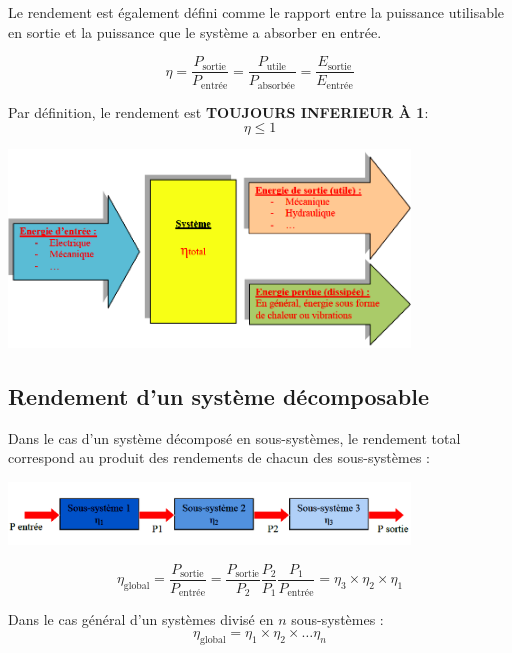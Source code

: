 \documentclass[10pt,fleqn]{article} %
\begin{document}
\begin{defi}
    Le rendement est également défini comme le rapport entre la puissance utilisable en sortie et la puissance que le système a absorber en entrée. 
    
    $$\eta = \frac{P_{\text{sortie}}}{P_{\text{entrée}}} = \frac{P_{\text{utile}}}{P_{\text{absorbée}}} = \frac{E_{\text{sortie}}}{E_{\text{entrée}}}$$
    
\parcoeur Par définition, le rendement est \textbf{TOUJOURS INFERIEUR À 1}: 
$$\eta \leq 1$$
\end{defi}

\begin{center}
    \includegraphics[width=0.8\textwidth]{Cours/images/rendement.png}
\end{center}

\subsection{Rendement d'un système décomposable}
Dans le cas d'un système décomposé en sous-systèmes, le rendement total correspond au produit des rendements de chacun des sous-systèmes : 
\begin{center}
    \includegraphics[width=0.8\textwidth]{Cours/images/rendement_multiple.png}
\end{center}

\begin{exemple}
    $$\eta_{\text{global}} = \frac{P_{\text{sortie}}}{P_{\text{entrée}}} = \frac{P_{\text{sortie}}}{P_{\text{2}}} \frac{P_{\text{2}}}{P_{\text{1}}} \frac{P_{\text{1}}}{P_{\text{entrée}}} = \eta_3 \times \eta_2 \times \eta_1$$
\end{exemple}
    \begin{defi}
     Dans le cas général d'un systèmes divisé en $n$ sous-systèmes :  
       $$ \eta_{\text{global}} = \eta_1 \times \eta_2 \times \dots \eta_n $$
    \end{defi}
\end{document}
